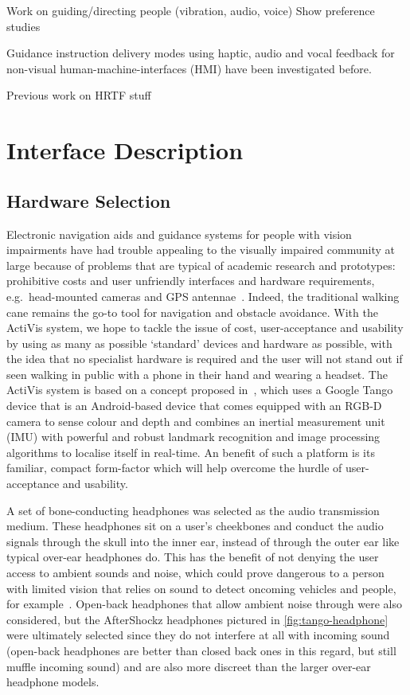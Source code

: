 \documentclass{llncs}
\begin{document}
Work on guiding/directing people (vibration, audio, voice)
Show preference studies

Guidance instruction delivery modes using haptic, audio and vocal feedback for non-visual human-machine-interfaces (HMI) have been investigated before. 

Previous work on HRTF stuff

\section{Interface Description}

\subsection{Hardware Selection}

Electronic navigation aids and guidance systems for people with vision impairments have had trouble appealing to the visually impaired community at large because of problems that are typical of academic research and prototypes: prohibitive costs and user unfriendly interfaces and hardware requirements, e.g.\ head-mounted cameras and GPS antennae~\cite{golledge2004stated,yusif2016older,arditi2013user}.
Indeed, the traditional walking cane remains the go-to tool for navigation and obstacle avoidance. 
With the ActiVis system, we hope to tackle the issue of cost, user-acceptance and usability by using as many as possible `standard' devices and hardware as possible, with the idea that no specialist hardware is required and the user will not stand out if seen walking in public with a phone in their hand and wearing a headset.
The ActiVis system is based on a concept proposed in~\cite{bellotto2013multimodal,lock2017portable}, which uses a Google Tango device that is an Android-based device that comes equipped with an RGB-D camera to sense colour and depth and combines an inertial measurement unit (IMU) with powerful and robust landmark recognition and image processing algorithms to localise itself in real-time.
An benefit of such a platform is its familiar, compact form-factor which will help overcome the hurdle of user-acceptance and usability.

A set of bone-conducting headphones was selected as the audio transmission medium.
These headphones sit on a user's cheekbones and conduct the audio signals through the skull into the inner ear, instead of through the outer ear like typical over-ear headphones do. 
This has the benefit of not denying the user access to ambient sounds and noise, which could prove dangerous to a person with limited vision that relies on sound to detect oncoming vehicles and people, for example~\cite{lichtenstein2012headphone}.
Open-back headphones that allow ambient noise through were also considered, but the AfterShockz headphones pictured in \cref{fig:tango-headphone} were ultimately selected since they do not interfere at all with incoming sound (open-back headphones are better than closed back ones in this regard, but still muffle incoming sound) and are also more discreet than the larger over-ear headphone models. 
\end{document}
